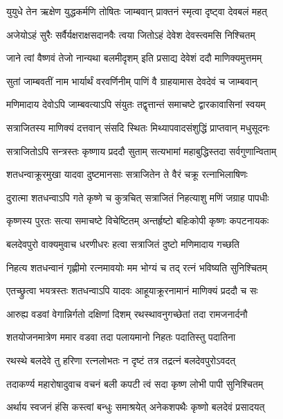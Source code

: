 \twolineshloka
{युयुधे तेन ऋक्षेण युद्धकर्मणि तोषितः}
{जाम्बवान् प्राक्तनं स्मृत्वा दृष्ट्वा देवबलं महत्}%


\twolineshloka
{अजेयोऽहं सुरैः सर्वैर्यक्षराक्षसदानवैः}
{त्वया जितोऽहं देवेश देवस्त्वमसि निश्चितम्}%

\twolineshloka
{जाने त्वां वैष्णवं तेजो नान्यथा बलमीदृशम्}
{इति प्रसाद्य देवेशं ददौ माणिक्यमुत्तमम्}%

\twolineshloka
{सुतां जाम्बवतीं नाम भार्यार्थं वरवर्णिनीम्}
{पाणिं वै ग्राहयामास देवदेवं च जाम्बवान्}%

\twolineshloka
{मणिमादाय देवोऽपि जाम्बवत्याऽपि संयुतः}
{तद्वृत्तान्तं समाचष्टे द्वारकावासिनां स्वयम्}%

\twolineshloka
{सत्राजितस्य माणिक्यं दत्तवान् संसदि स्थितः}
{मिथ्यापवादसंशुद्धिं प्राप्तवान् मधुसूदनः}%

\twolineshloka
{सत्राजितोऽपि सन्त्रस्तः कृष्णाय प्रददौ सुताम्}
{सत्यभामां महाबुद्धिस्तदा सर्वगुणान्विताम्}%

\twolineshloka
{शतधन्वाक्रूरमुखा यादवा दुष्टमानसाः}
{सत्राजितेन ते वैरं चक्रू रत्नाभिलाषिणः}%

\twolineshloka
{दुरात्मा शतधन्वाऽपि गते कृष्णे च कुत्रचित्}
{सत्राजितं निहत्याशु मणिं जग्राह पापधीः}%

\twolineshloka
{कृष्णस्य पुरतः सत्या समाचष्टे विचेष्टितम्}
{अन्तर्हृष्टो बहिःकोपी कृष्णः कपटनायकः}%

\twolineshloka
{बलदेवपुरो वाक्यमुवाच धरणीधरः}
{हत्वा सत्राजितं दुष्टो मणिमादाय गच्छति}%

\twolineshloka
{निहत्य शतधन्वानं गृह्णीमो रत्नमावयोः}
{मम भोग्यं च तद् रत्नं भविष्यति सुनिश्चितम्}%

\twolineshloka
{एतच्छ्रुत्वा  भयत्रस्तः शतधन्वाऽपि यादवः}
{आहूयाक्रूरनामानं माणिक्यं प्रददौ च सः}%

\twolineshloka
{आरुह्य वडवां वेगान्निर्गतो दक्षिणां दिशम्}
{रथस्थावनुगच्छेतां तदा रामजनार्दनौ}%

\twolineshloka
{शतयोजनमात्रेण ममार वडवा तदा}
{पलायमानो निहतः पदातिस्तु पदातिना}%

\twolineshloka
{रथस्थे बलदेवे तु हरिणा रत्नलोभतः}
{न दृष्टं तत्र तद्रत्नं बलदेवपुरोऽवदत्}%

\twolineshloka
{तदाकर्ण्य महारोषादुवाच वचनं बली}
{कपटी त्वं सदा कृष्ण लोभी पापी सुनिश्चितम्}%

\twolineshloka
{अर्थाय स्वजनं हंसि कस्त्वां बन्धुः समाश्रयेत्}
{अनेकशपथैः कृष्णो बलदेवं प्रसादयत्}%

